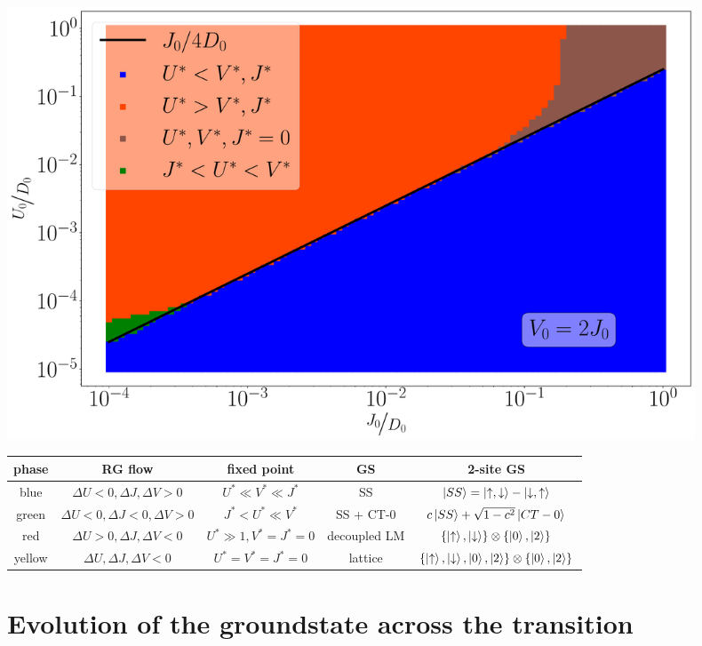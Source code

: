 \documentclass{report}
\numberwithin{equation}{section}
\begin{document}
\begin{center}
	\includegraphics[width=0.9\textwidth]{../figures/phase-map-MIT.pdf}
\end{center}

\begin{center}
\begin{tabular}{|c|c|c|c|c|}
\hline
phase & RG flow & fixed point & GS & 2-site GS \\ 
\hline
blue & \(\Delta U <0, \Delta J,\Delta V>0\) & \(U^* \ll V^* \ll J^*\) & SS & \(\ket{SS}=\ket{\uparrow,\downarrow} - \ket{\downarrow, \uparrow}\)  \\ 
green &  \(\Delta U < 0, \Delta J < 0,\Delta V>0\) & \(J^* < U^* \ll V^*\) & SS + CT-0 & \(c\ket{SS} + \sqrt{1-c^2}\ket{CT-0}\)  \\  
red &  \(\Delta U > 0, \Delta J,\Delta V<0\) & \(U^* \gg 1,  V^* = J^* = 0\) & decoupled LM & \(\left\{\ket{\uparrow}, \ket{\downarrow} \right\} \otimes \left\{\ket{0}, \ket{2}\right\} \) \\
yellow &  \(\Delta U, \Delta J,\Delta V < 0\) & \(U^* = V^* = J^* = 0\) & lattice & \(\left\{\ket{\uparrow}, \ket{\downarrow}, \ket{0}, \ket{2} \right\} \otimes \left\{\ket{0}, \ket{2}\right\}\) \\
\hline
\end{tabular}
\end{center}

\section{Evolution of the groundstate across the transition}
\end{document}
